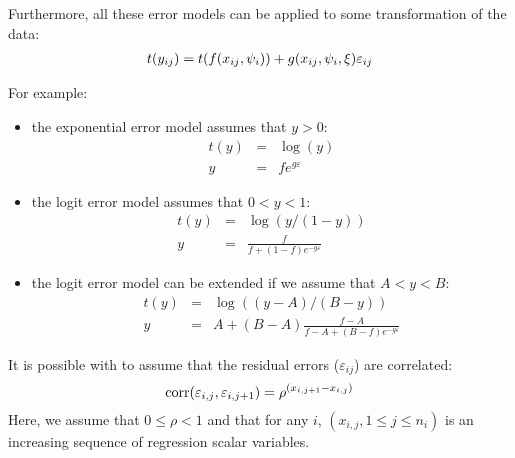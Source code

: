 Furthermore, all these error models can be applied to some transformation of the data:
\begin{eqnarray}\label{def_t}
t(y_{ij})=t(f(x_{ij},{\psi_i}))+ g(x_{ij},{\psi_i},\xi)\varepsilon_{ij}
\end{eqnarray}

For example:
\begin{itemize}
\item the exponential error model assumes that $y>0$:
\begin{eqnarray*}
t(y) &=& \log(y) \\
y&=&f e^{g\varepsilon}
\end{eqnarray*}
\item the logit error model assumes that $0<y<1$:
\begin{eqnarray*}
t(y)&=&\log(y/(1-y)) \\
 y&=&\frac{f}{f+(1-f) e^{-g\varepsilon}}
\end{eqnarray*}
\item the logit error model can be extended if we assume that $A<y<B$:
\begin{eqnarray*}
 t(y)&=&\log((y-A)/(B-y)) \\
y&=&A+(B-A)\frac{f-A}{f-A+(B-f) e^{-g\varepsilon}}
\end{eqnarray*}
\end{itemize}

\noindent It is possible with \monolix to assume that the residual errors ($\varepsilon_{ij}$) are correlated:
\begin{equation} \label{autocorr}
{\rm corr}(\varepsilon_{i,j},\varepsilon_{i,j+1}) = \rho^{(x_{i,j+1}-x_{i,j})}
\end{equation}
Here, we assume that $0\leq \rho <1$ and that for any $i$,
$(x_{i,j}, 1\leq j \leq n_i)$ is an increasing sequence of
regression scalar variables.





